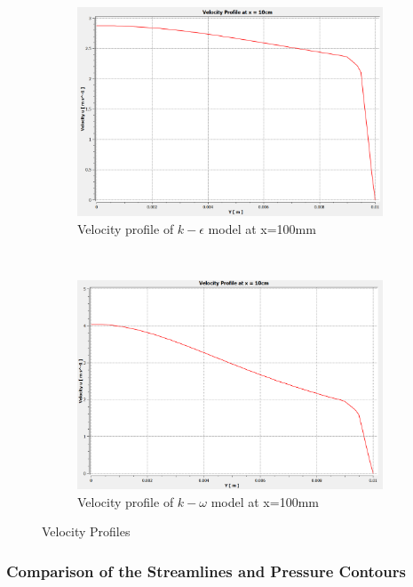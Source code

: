 \begin{figure}[H]
     ~
    \begin{subfigure}{.48\textwidth}
    \centering
    \includegraphics[width=.95\linewidth]{images/task2/task2-1/cs8.png}
    \caption{Velocity profile of $k-\epsilon$ model at x=100mm}
\end{subfigure}
    ~
    \begin{subfigure}{.48\textwidth}
    \centering
    \includegraphics[width=.95\linewidth]{images/task2/task2-2/cs8.png}
    \caption{Velocity profile of $k-\omega$ model at x=100mm}
\end{subfigure}
    
    
    \caption{Velocity Profiles}
    \label{fig:task2prof2}
\end{figure}
\newpage

\subsubsection{Comparison of the Streamlines and Pressure Contours}

